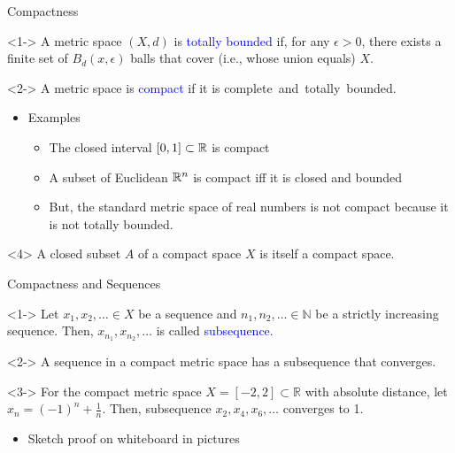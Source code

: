 \documentclass[10pt,english]{beamer}
\begin{document}
\begin{frame}{Compactness}

\begin{definition}<1->
A metric space $(X,d)$ is \textcolor{blue}{totally bounded} if, for any $\epsilon > 0$, there exists a finite set of $B_d (x,\epsilon)$ balls that cover (i.e., whose union equals) $X$.
\end{definition}

\begin{definition}<2->
A metric space is \textcolor{blue}{compact} if it is complete~and~totally~bounded.
\end{definition}

\begin{itemize}
\setlength\itemsep{3mm}
\item<3-> Examples \vspace{1mm}
\begin{itemize} 
  \setlength\itemsep{1.5mm}
  \item The closed interval $[0,1]\subset \mathbb{R}$ is compact
  \item A subset of Euclidean $\mathbb{R}^n$ is compact iff it is closed and bounded
  \item But, the standard metric space of real numbers is not compact because it is not totally bounded.
\end{itemize}

\end{itemize}

\begin{theorem}<4>
A closed subset $A$ of a compact space $X$ is itself a compact space.
\end{theorem}

\end{frame}

\begin{frame}{Compactness and Sequences}

\begin{definition}<1->
Let $x_1,x_2,\ldots \in X$ be a sequence and $n_1,n_2,\ldots\in \mathbb{N}$ be
a strictly increasing sequence.
Then, $x_{n_1},x_{n_2},\ldots$ is called \textcolor{blue}{subsequence}.
\end{definition}

\begin{theorem}<2->
A sequence in a compact metric space has a subsequence that converges.
\end{theorem}

\begin{example}<3->
For the compact metric space $X=[-2,2]\subset \mathbb{R}$ with absolute distance, let $x_n = (-1)^n + \frac{1}{n}$.
Then, subsequence $x_2,x_4,x_6,\ldots$ converges to 1.
\end{example}

\begin{itemize}
\item<3-> Sketch proof on whiteboard in pictures
\end{itemize}

\end{frame}
\end{document}
